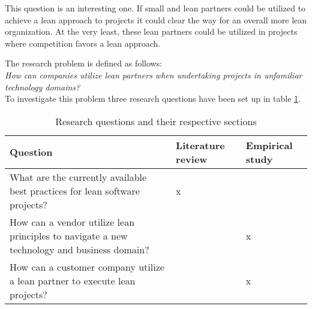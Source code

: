 This question is an interesting one. If small and lean partners could be utilized to achieve a lean approach to projects it could clear the way for an overall more lean organization. At the very least, these lean partners could be utilized in projects where competition favors a lean approach.

The research problem is defined as follows:\\

\textit{How can companies utilize lean partners when undertaking projects in unfamiliar technology domains?}\\

To investigate this problem three research questions have been set up in table \ref{tbl:questions}.


\begin{table}
  \begin{tabular}{p{200pt} | p{70pt} | p{70pt}}
    Question & Literature review & Empirical study \\
    \hline
    What are the currently available best practices for lean software projects? & x & \\
    How can a vendor utilize lean principles to navigate a new technology and business domain? &  & x \\
    How can a customer company utilize a lean partner to execute lean projects? &  & x \\
  \end{tabular}
  \caption{Research questions and their respective sections}
  \label{tbl:questions}
\end{table}